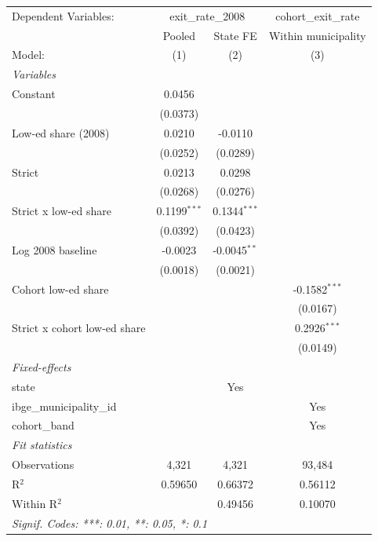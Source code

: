 
\begingroup
\centering
\begin{tabular}{lccc}
   \tabularnewline \midrule \midrule
   Dependent Variables: & \multicolumn{2}{c}{exit\_rate\_2008} & cohort\_exit\_rate\\
                                & Pooled         & State FE       & Within municipality \\
   Model:                       & (1)            & (2)            & (3)\\
   \midrule
   \emph{Variables}\\
   Constant                     & 0.0456         &                &   \\
                                & (0.0373)       &                &   \\
   Low-ed share (2008)          & 0.0210         & -0.0110        &   \\
                                & (0.0252)       & (0.0289)       &   \\
   Strict                       & 0.0213         & 0.0298         &   \\
                                & (0.0268)       & (0.0276)       &   \\
   Strict x low-ed share        & 0.1199$^{***}$ & 0.1344$^{***}$ &   \\
                                & (0.0392)       & (0.0423)       &   \\
   Log 2008 baseline            & -0.0023        & -0.0045$^{**}$ &   \\
                                & (0.0018)       & (0.0021)       &   \\
   Cohort low-ed share          &                &                & -0.1582$^{***}$\\
                                &                &                & (0.0167)\\
   Strict x cohort low-ed share &                &                & 0.2926$^{***}$\\
                                &                &                & (0.0149)\\
   \midrule
   \emph{Fixed-effects}\\
   state                        &                & Yes            & \\
   ibge\_municipality\_id       &                &                & Yes\\
   cohort\_band                 &                &                & Yes\\
   \midrule
   \emph{Fit statistics}\\
   Observations                 & 4,321          & 4,321          & 93,484\\
   R$^2$                        & 0.59650        & 0.66372        & 0.56112\\
   Within R$^2$                 &                & 0.49456        & 0.10070\\
   \midrule \midrule
   \multicolumn{4}{l}{\emph{Signif. Codes: ***: 0.01, **: 0.05, *: 0.1}}\\
\end{tabular}
\par\endgroup
